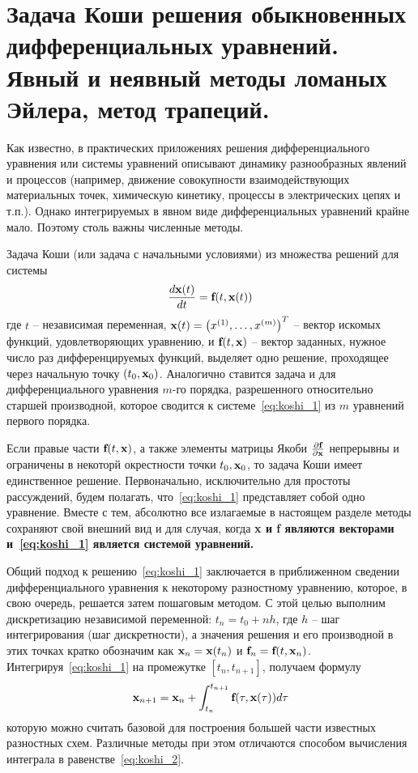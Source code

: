 \section{Задача Коши решения обыкновенных дифференциальных уравнений. Явный и неявный методы ломаных Эйлера, метод трапеций.}\label{sec:ch24}
Как известно, в практических приложениях решения дифференциального уравнения или системы уравнений описывают
динамику разнообразных явлений и процессов (например, движение совокупности взаимодействующих материальных точек,
химическую кинетику, процессы в электрических цепях и т.п.). Однако интегрируемых в явном виде дифференциальных
уравнений крайне мало. Поэтому столь важны численные методы.

Задача Коши (или задача с начальными условиями) из множества решений для системы
\begin{equation}
    \frac{d\bf{x}(t)}{dt} = \bf{f}(t, \bf{x}(t)) \label{eq:koshi_1}
\end{equation}
где $t$ -- независимая переменная, $\bf{x}(t) = \left( x^{(1)}, \ldots, x^{(m)} \right)^T$ -- вектор искомых функций,
удовлетворяющих уравнению, и $\bf{f}(t, \bf{x})$ -- вектор заданных, нужное число раз дифференцируемых функций,
выделяет одно решение, проходящее через начальную точку $(t_0, \bf{x}_0)$. Аналогично ставится задача и для
дифференциального уравнения $m$-го порядка, разрешенного относительно старшей производной, которое сводится к
системе~\eqref{eq:koshi_1} из $m$ уравнений первого порядка.

Если правые части $\bf{f}(t, \bf{x})$, а также элементы матрицы Якоби $\frac{\partial \bf{f}}{\partial \bf{x}}$
непрерывны и ограничены в некоторй окрестности точки $t_0, \bf{x}_0$, то задача Коши имеет единственное решение.
Первоначально, исключительно для простоты рассуждений, будем полагать, что~\eqref{eq:koshi_1} представляет собой
одно уравнение. Вместе с тем, абсолютно все излагаемые в настоящем разделе методы сохраняют свой внешний вид и для
случая, когда \bf{x} и \bf{f} являются векторами и~\eqref{eq:koshi_1} является системой уравнений.

Общий подход к решению~\eqref{eq:koshi_1} заключается в приближенном сведении дифференциального уравнения к
некоторому разностному уравнению, которое, в свою очередь, решается затем пошаговым методом. С этой целью
выполним дискретизацию независимой переменной: $t_n = t_0 + nh$, где $h$ -- шаг интегрирования (шаг дискретности), а
значения решения и его производной в этих точках кратко обозначим как $\bf{x}_n = \bf{x}(t_n)$ и $\bf{f}_n = \bf{f}(t, \bf{x}_n)$.
Интегрируя~\eqref{eq:koshi_1} на промежутке $[t_n, t_{n+1}]$, получаем формулу
\begin{equation}
    \bf{x}_{n+1} = \bf{x}_n + \int_{t_n}^{t_{n+1}} \bf{f}(\tau, \bf{x}(\tau))d\tau \label{eq:koshi_2}
\end{equation}
которую можно считать базовой для построения большей части известных разностных схем. Различные методы при этом
отличаются способом вычисления интеграла в равенстве~\eqref{eq:koshi_2}.

